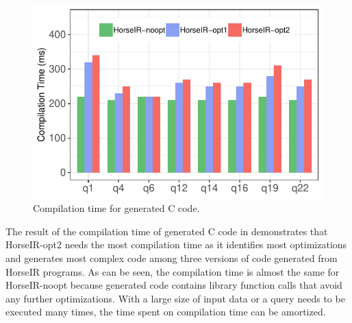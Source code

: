 \begin{figure}[htbp]
\centering
\includegraphics[width=.9\columnwidth]{./src/figure/compile-time.pdf}
\caption{Compilation time for generated C code.}
\label{fig:compilation_time}
\end{figure}

The result of the compilation time of generated C code in
 demonstrates that HorseIR-opt2 needs the most
compilation time as it identifies most optimizations and generates most complex
code among three versions of code generated from HorseIR programs.
As can be seen, the compilation time is almost the same for HorseIR-noopt because
generated code contains library function calls that avoid any further optimizations.
With a large size of input data or a query needs to be executed many times,
the time spent on compilation time can be amortized.






